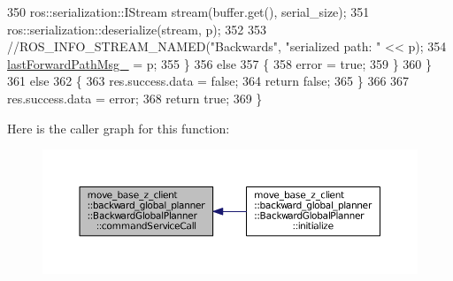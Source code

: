 \begin{DoxyCode}
350             ros::serialization::IStream stream(buffer.get(), serial\_size);
351             ros::serialization::deserialize(stream, p);
352 
353             \textcolor{comment}{//ROS\_INFO\_STREAM\_NAMED("Backwards", "serialized path: " << p);}
354             \hyperlink{classmove__base__z__client_1_1backward__global__planner_1_1BackwardGlobalPlanner_a058da13b9ee6b1d878830503e67de638}{lastForwardPathMsg\_} = p;
355         \}
356         \textcolor{keywordflow}{else}
357         \{
358             error = \textcolor{keyword}{true};
359         \}
360     \}
361     \textcolor{keywordflow}{else}
362     \{
363         res.success.data = \textcolor{keyword}{false};
364         \textcolor{keywordflow}{return} \textcolor{keyword}{false};
365     \}
366 
367     res.success.data = error;
368     \textcolor{keywordflow}{return} \textcolor{keyword}{true};
369 \}
\end{DoxyCode}


Here is the caller graph for this function\+:
\nopagebreak
\begin{figure}[H]
\begin{center}
\leavevmode
\includegraphics[width=350pt]{classmove__base__z__client_1_1backward__global__planner_1_1BackwardGlobalPlanner_ad6f5fb1f85f6869b06bd4cb0feada148_icgraph}
\end{center}
\end{figure}


